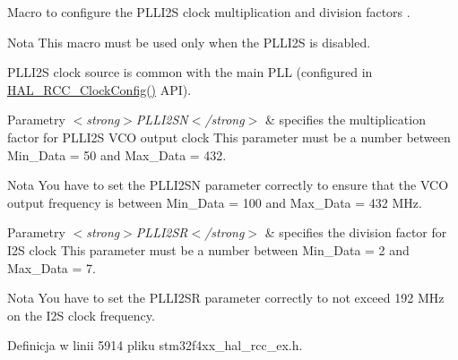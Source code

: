 Macro to configure the P\+L\+L\+I2S clock multiplication and division factors . 

\begin{DoxyNote}{Nota}
This macro must be used only when the P\+L\+L\+I2S is disabled. 

P\+L\+L\+I2S clock source is common with the main P\+LL (configured in \hyperlink{group___r_c_c___exported___functions___group1_gad0a4b5c7459219fafc15f3f867563ef3}{H\+A\+L\+\_\+\+R\+C\+C\+\_\+\+Clock\+Config()} A\+PI). 
\end{DoxyNote}

\begin{DoxyParams}{Parametry}
{\em $<$strong$>$\+P\+L\+L\+I2\+S\+N$<$/strong$>$} & specifies the multiplication factor for P\+L\+L\+I2S V\+CO output clock This parameter must be a number between Min\+\_\+\+Data = 50 and Max\+\_\+\+Data = 432. \\
\hline
\end{DoxyParams}
\begin{DoxyNote}{Nota}
You have to set the P\+L\+L\+I2\+SN parameter correctly to ensure that the V\+CO output frequency is between Min\+\_\+\+Data = 100 and Max\+\_\+\+Data = 432 M\+Hz.
\end{DoxyNote}

\begin{DoxyParams}{Parametry}
{\em $<$strong$>$\+P\+L\+L\+I2\+S\+R$<$/strong$>$} & specifies the division factor for I2S clock This parameter must be a number between Min\+\_\+\+Data = 2 and Max\+\_\+\+Data = 7. \\
\hline
\end{DoxyParams}
\begin{DoxyNote}{Nota}
You have to set the P\+L\+L\+I2\+SR parameter correctly to not exceed 192 M\+Hz on the I2S clock frequency. 
\end{DoxyNote}


Definicja w linii 5914 pliku stm32f4xx\+\_\+hal\+\_\+rcc\+\_\+ex.\+h.

